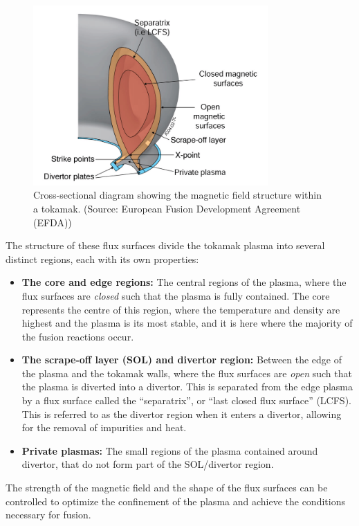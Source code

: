     \begin{figure}[!ht]
        \centering
        \includegraphics[width = 0.8\textwidth]{0 - introduction/1 - plasmas/3 - tokamaks/images/tokamak structure.png}
        \caption{Cross-sectional diagram showing the magnetic field structure within a tokamak. (Source: European Fusion Development Agreement (EFDA))}
        \label{fig:tokamak structure}
    \end{figure}

    The structure of these flux surfaces divide the tokamak plasma into several distinct regions, each with its own properties:
    \begin{itemize}
        \item  {\bf The core and edge regions:} The central regions of the plasma, where the flux surfaces are \emph{closed} such that the plasma is fully contained. The core represents the centre of this region, where the temperature and density are highest and the plasma is its most stable, and it is here where the majority of the fusion reactions occur.
        \item  {\bf The scrape-off layer (SOL) and divertor region:} Between the edge of the plasma and the tokamak walls, where the flux surfaces are \emph{open} such that the plasma is diverted into a divertor. This is separated from the edge plasma by a flux surface called the ``separatrix'', or ``last closed flux surface'' (LCFS). This is referred to as the divertor region when it enters a divertor, allowing for the removal of impurities and heat.
        \item  {\bf Private plasmas:} The small regions of the plasma contained around divertor, that do not form part of the SOL/divertor region.
    \end{itemize}
    The strength of the magnetic field and the shape of the flux surfaces can be controlled to optimize the confinement of the plasma and achieve the conditions necessary for fusion.
    